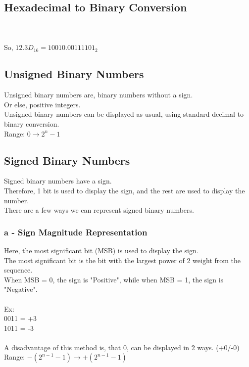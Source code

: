 \documentclass{article}
\begin{document}
\subsection*{Hexadecimal to Binary Conversion}

\\
\\
So, $12.3D_{16} = 10010.00111101_2$
\subsection*{Unsigned Binary Numbers}
Unsigned binary numbers are, binary numbers without a sign.\\
Or else, positive integers.\\
Unsigned binary numbers can be displayed as usual, using standard decimal to binary conversion.\\
Range: $ 0 \rightarrow  2^n - 1$
\subsection*{Signed Binary Numbers}
Signed binary numbers have a sign.\\
Therefore, 1 bit is used to display the sign, and the rest are used to display the number.\\
There are a few ways we can represent signed binary numbers.
\subsubsection*{a - Sign Magnitude Representation}
Here, the most significant bit (MSB) is used to display the sign.\\
The most significant bit is the bit with the largest power of 2 weight from the sequence.\\
When MSB = 0, the sign is "Positive", while when MSB = 1,  the sign is "Negative".\\
\\
Ex:\\
0011 = +3\\
1011 = -3\\
\\
A disadvantage of this method is, that 0, can be displayed in 2 ways. (+0/-0)\\
Range: $-(2^{n-1} - 1) \rightarrow +(2^{n-1} - 1)$
\newpage
\end{document}
